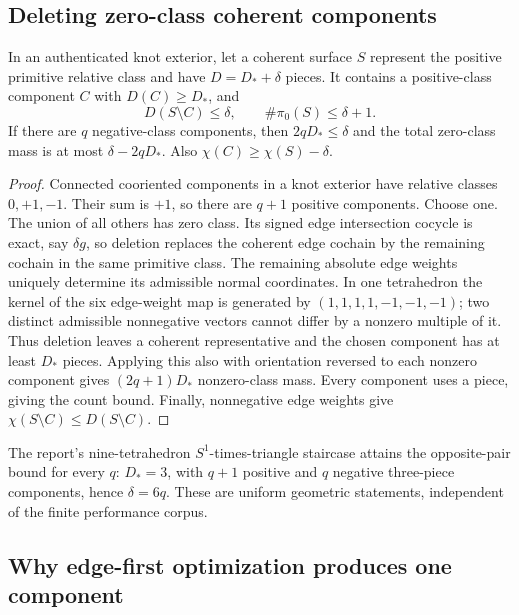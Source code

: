 \subsection{Deleting zero-class coherent components}

\begin{proposition}
In an authenticated knot exterior, let a coherent surface $S$ represent
the positive primitive relative class and have $D=D_*+\delta$ pieces.
It contains a positive-class component $C$ with $D(C)\ge D_*$, and
\[
 D(S\setminus C)\le\delta,\qquad
 \#\pi_0(S)\le\delta+1.
\]
If there are $q$ negative-class components, then $2qD_*\le\delta$ and
the total zero-class mass is at most $\delta-2qD_*$. Also
$\chi(C)\ge\chi(S)-\delta$.
\end{proposition}
\begin{proof}
Connected cooriented components in a knot exterior have relative classes
$0,+1,-1$. Their sum is $+1$, so there are $q+1$ positive components.
Choose one. The union of all others has zero class. Its signed edge
intersection cocycle is exact, say $\delta g$, so deletion replaces the
coherent edge cochain by the remaining cochain in the same primitive class.
The remaining absolute edge weights uniquely determine its admissible
normal coordinates. In one tetrahedron the kernel of the six edge-weight
map is generated by $(1,1,1,1,-1,-1,-1)$; two distinct admissible
nonnegative vectors cannot differ by a nonzero multiple of it.
Thus deletion leaves a coherent representative and the chosen component
has at least $D_*$ pieces. Applying this also with orientation reversed
to each nonzero component gives $(2q+1)D_*$ nonzero-class mass.
Every component uses a piece, giving the count bound. Finally,
nonnegative edge weights give $\chi(S\setminus C)\le D(S\setminus C)$.
\end{proof}

The report's nine-tetrahedron $S^1$-times-triangle staircase attains the
opposite-pair bound for every $q$: $D_*=3$, with $q+1$ positive and $q$
negative three-piece components, hence $\delta=6q$. These are uniform
geometric statements, independent of the finite performance corpus.

\subsection{Why edge-first optimization produces one component}

